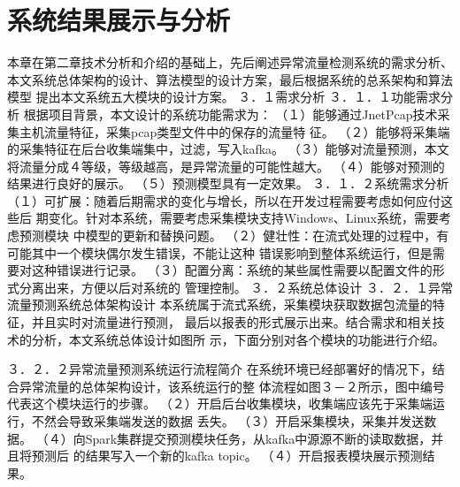 \section{系统结果展示与分析}
本章在第二章技术分析和介绍的基础上，先后阐述异常流量检测系统的需求分析、
本文系统总体架构的设计、算法模型的设计方案，最后根据系统的总系架构和算法模型
提出本文系统五大模块的设计方案。
３．１需求分析
３．１．１功能需求分析
根据项目背景，本文设计的系统功能需求为：
（１）能够通过JnetPcap技术采集主机流量特征，采集pcap类型文件中的保存的流量特
征。
（２）能够将采集端的采集特征在后台收集端集中，过滤，写入kafka。
（３）能够对流量预测，本文将流量分成４等级，等级越高，是异常流量的可能性越大。
（４）能够对预测的结果进行良好的展示。
（５）预测模型具有一定效果。
３．１．２系统需求分析
（１）可扩展：随着后期需求的变化与增长，所以在开发过程需要考虑如何应付这些后
期变化。针对本系统，需要考虑采集模块支持Windows、Linux系统，需要考虑预测模块
中模型的更新和替换问题。
（２）健壮性：在流式处理的过程中，有可能其中一个模块偶尔发生错误，不能让这种
错误影响到整体系统运行，但是需要对这种错误进行记录。
（３）配置分离：系统的某些属性需要以配置文件的形式分离出来，方便以后对系统的
管理控制。
３．２系统总体设计
３．２．１异常流量预测系统总体架构设计
本系统属于流式系统，采集模块获取数据包流量的特征，并且实时对流量进行预测，
最后以报表的形式展示出来。结合需求和相关技术的分析，本文系统总体设计如图所
示，下面分别对各个模块的功能进行介绍。

３．２．２异常流量预测系统运行流程简介
在系统环境已经部署好的情况下，结合异常流量的总体架构设计，该系统运行的整
体流程如图３－２所示，图中编号代表这个模块运行的步骤。
（２）开启后台收集模块，收集端应该先于采集端运行，不然会导致采集端发送的数据
丢失。
（３）开启采集模块，采集并发送数据。
（４）向Spark集群提交预测模块任务，从kafka中源源不断的读取数据，并且将预测后
的结果写入一个新的kafka topic。
（４）开启报表模块展示预测结果。


